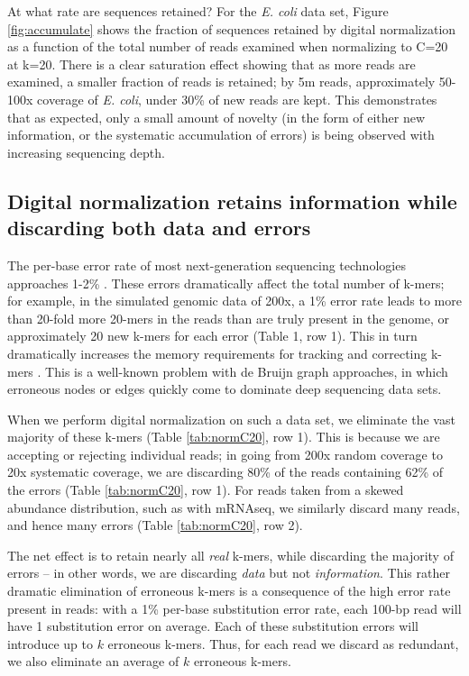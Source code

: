 \documentclass[10pt]{article}
\begin{document}
At what rate are sequences retained?  For the {\em E. coli} data set,
Figure \ref{fig:accumulate} shows the fraction of sequences retained
by digital normalization as a function of the total number of reads
examined when normalizing to C=20 at k=20.  There is a clear
saturation effect showing that as more reads are examined, a smaller
fraction of reads is retained; by 5m reads, approximately 50-100x
coverage of {\em E. coli}, under 30\% of new reads are kept.  This
demonstrates that as expected, only a small amount of novelty (in
the form of either new information, or the systematic accumulation of
errors) is being observed with increasing sequencing depth.


\subsection*{Digital normalization retains information while discarding
both data and errors}

The per-base error rate of most next-generation sequencing
technologies approaches 1-2\% \cite{pubmed19997069}.  These errors
dramatically affect the total number of k-mers; for example, in the
simulated genomic data of 200x, a 1\% error rate leads to more than
20-fold more 20-mers in the reads than are truly present in the
genome, or approximately 20 new k-mers for each error (Table 1, row
1).  This in turn dramatically increases the memory requirements for
tracking and correcting k-mers \cite{pubmed21245053}.  This is a
well-known problem with de Bruijn graph approaches, in which erroneous
nodes or edges quickly come to dominate deep sequencing data sets.

When we perform digital normalization on such a data set, we eliminate
the vast majority of these k-mers (Table \ref{tab:normC20}, row 1).  This
is because we are accepting or rejecting individual reads; in going
from 200x random coverage to 20x systematic coverage, we are
discarding 80\% of the reads containing 62\% of the errors (Table
\ref{tab:normC20}, row 1).  For reads taken from a skewed abundance
distribution, such as with mRNAseq, we similarly discard many reads, and
hence many errors (Table \ref{tab:normC20}, row 2).

The net effect is to retain nearly all {\em real} k-mers, while
discarding the majority of errors -- in other words, we are discarding
{\em data} but not {\em information}.  This rather dramatic
elimination of erroneous k-mers is a consequence of the high error
rate present in reads: with a 1\% per-base substitution error rate,
each 100-bp read will have 1 substitution error on average. Each of
these substitution errors will introduce up to $k$ erroneous k-mers.
Thus, for each read we discard as redundant, we also eliminate an
average of $k$ erroneous k-mers.
\end{document}
